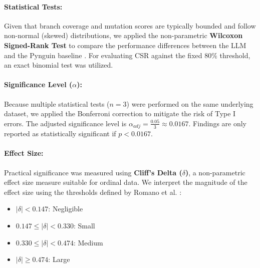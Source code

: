 \paragraph{Statistical Tests:} Given that branch coverage and mutation scores are typically bounded and follow non-normal (skewed) distributions, we applied the non-parametric \textbf{Wilcoxon Signed-Rank Test} to compare the performance differences between the LLM and the Pynguin baseline \cite{arcuri2011practical}. For evaluating CSR against the fixed $80\%$ threshold, an exact binomial test was utilized.

\paragraph{Significance Level ($\alpha$):} Because multiple statistical tests ($n=3$) were performed on the same underlying dataset, we applied the Bonferroni correction to mitigate the risk of Type I errors. The adjusted significance level is $\alpha_{adj} = \frac{0.05}{3} \approx 0.0167$. Findings are only reported as statistically significant if $p < 0.0167$.

\paragraph{Effect Size:} Practical significance was measured using \textbf{Cliff's Delta ($\delta$)}, a non-parametric effect size measure suitable for ordinal data. We interpret the magnitude of the effect size using the thresholds defined by Romano et al. \cite{romano2006appropriate}:
\begin{itemize}
    \item $|\delta| < 0.147$: Negligible
    \item $0.147 \le |\delta| < 0.330$: Small
    \item $0.330 \le |\delta| < 0.474$: Medium
    \item $|\delta| \ge 0.474$: Large
\end{itemize}